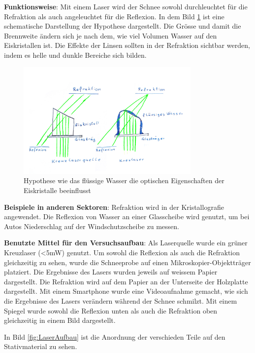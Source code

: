 

\textbf{Funktionsweise}: Mit einem Laser wird der Schnee sowohl durchleuchtet für die Refraktion als auch angeleuchtet für die Reflexion. In dem Bild \ref{fig:LaserHypothese} ist eine schematische Darstellung der Hypothese dargestellt. Die Grösse und damit die Brennweite ändern sich je nach dem, wie viel Volumen Wasser auf den Eiskristallen ist. Die Effekte der Linsen sollten in der Refraktion sichtbar werden, indem es helle und dunkle Bereiche sich bilden.


\begin{figure}
    \centering
    \includegraphics[width=0.8\textwidth]{Bilder/Reflaktion.jpeg}
    \caption{Hypothese wie das flüssige Wasser die optischen Eigenschaften der Eiskristalle beeinflusst}
    \label{fig:LaserHypothese}
\end{figure}

\textbf{Beispiele in anderen Sektoren}:
Refraktion wird in der Kristallografie angewendet. Die Reflexion von Wasser an einer Glasscheibe wird genutzt, um bei Autos Niederschlag auf der Windschutzscheibe zu messen.


\textbf{Benutzte Mittel für den Versuchsaufbau}:
Als Laserquelle wurde ein grüner Kreuzlaser (<5mW) genutzt. Um sowohl die Reflexion als auch die Refraktion gleichzeitig zu sehen, wurde die Schneeprobe auf einen Mikroskopier-Objektträger platziert. Die Ergebnisse des Lasers wurden jeweils auf weissem Papier dargestellt. Die Refraktion wird auf dem Papier an der Unterseite der Holzplatte dargestellt. Mit einem Smartphone wurde eine Videoaufnahme gemacht, wie sich die Ergebnisse des Lasers verändern während der Schnee schmilzt. Mit einem Spiegel wurde sowohl die Reflexion unten als auch die Refraktion oben gleichzeitig in einem Bild dargestellt.



In Bild \ref{fig:LaserAufbau} ist die Anordnung der verschieden Teile auf den Stativmaterial zu sehen.


